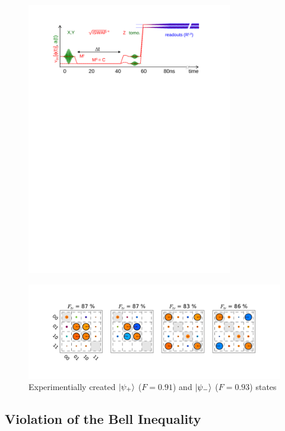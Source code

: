 \begin{figure}
	\centering
		\includegraphics[width=0.8\textwidth]{./material/papers/iswap/figures/iswap_gate_pulse_sequence}
	\label{fig:ISwapPulseSequence}
	\caption{}
\end{figure}

\begin{figure}
  \flushright
	\includegraphics[width=1\textwidth]{"./data/ct5/2011_02_09 preparation of bell states/bell matrices"}
	\caption{Experimentially created $\left| \psi_+ \right>$ ($F = 0.91$) and $\left| \psi_- \right>$ ($F=0.93$) states}
	\label{fig:BellStates}
\end{figure}

\subsection{Violation of the Bell Inequality}

